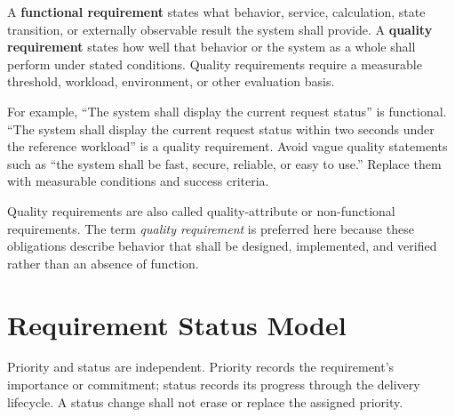 \begin{dsnNote}
A \textbf{functional requirement} states what behavior, service, calculation,
state transition, or externally observable result the system shall provide. A
\textbf{quality requirement} states how well that behavior or the system as a
whole shall perform under stated conditions. Quality requirements require a
measurable threshold, workload, environment, or other evaluation basis.
\end{dsnNote}

For example, ``The system shall display the current request status'' is
functional. ``The system shall display the current request status within two
seconds under the reference workload'' is a quality requirement. Avoid vague
quality statements such as ``the system shall be fast, secure, reliable, or
easy to use.'' Replace them with measurable conditions and success criteria.

Quality requirements are also called quality-attribute or non-functional
requirements. The term \emph{quality requirement} is preferred here because
these obligations describe behavior that shall be designed, implemented, and
verified rather than an absence of function.

\section{Requirement Status Model}
Priority and status are independent. Priority records the requirement's
importance or commitment; status records its progress through the delivery
lifecycle. A status change shall not erase or replace the assigned priority.

